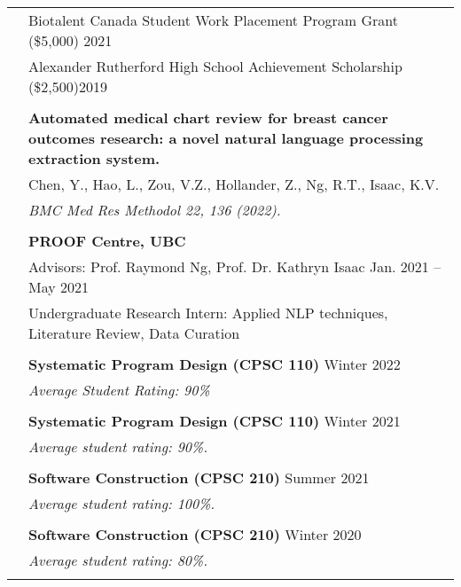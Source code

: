\documentclass[letterpaper, 11pt]{article}
\begin{document}
\begin{longtable}{p{1.3in}p{4.8in}}
{\color{Blue}{Honours and}} 
& Biotalent Canada Student Work Placement Program Grant (\$5,000) \hfill 2021\\
{\color{Blue}{Scholarships}} 
& Alexander Rutherford High School Achievement Scholarship (\$2,500)\hfill 2019 \\
& \\

\nohyphens{\color{Blue}{Publications}} 
& \textbf{Automated medical chart review for breast cancer outcomes research: a novel natural language processing extraction system.} \\
& Chen, Y., Hao, L., Zou, V.Z., Hollander, Z., Ng, R.T., Isaac, K.V. \\
& \textit{BMC Med Res Methodol 22, 136 (2022).} \\
& \\

\nohyphens{\color{Blue}{Research Experience}} 
& \textbf{PROOF Centre, UBC} \\
& Advisors: Prof. Raymond Ng, Prof. Dr. Kathryn Isaac \hfill Jan. 2021 -- May 2021 \\
& Undergraduate Research Intern: Applied NLP techniques, Literature Review, Data Curation \\
& \\

{\color{Blue}{Teaching Experience}} 
& \textbf{Systematic Program Design (CPSC 110)} \hfill Winter 2022 \\
& \textit{Average Student Rating: 90\% } \\
& \\

& \textbf{Systematic Program Design (CPSC 110)} \hfill Winter 2021 \\
& \textit{Average student rating: 90\%.} \\
& \\

& \textbf{Software Construction (CPSC 210)} \hfill Summer 2021 \\
& \textit{Average student rating: 100\%.} \\
& \\

& \textbf{Software Construction (CPSC 210)} \hfill Winter 2020 \\
& \textit{Average student rating: 80\%.} \\
& \\


\end{longtable}
\end{document}
